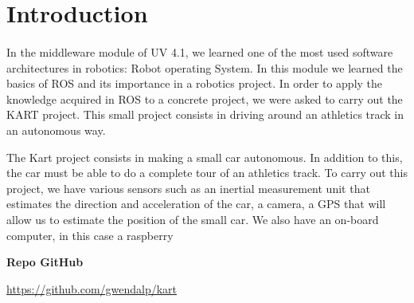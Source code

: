 \section{Introduction}
\paragraph{}In the middleware module of UV 4.1, we learned one of the most used software architectures in robotics: Robot operating System. In this module we learned the basics of ROS and its importance in a robotics project. In order to apply the knowledge acquired in ROS to a concrete project, we were asked to carry out the KART project. 
This small project consists in driving around an athletics track in an autonomous way.

The Kart project consists in making a small car autonomous. In addition to this, the car must be able to do a complete tour of an athletics track. 
To carry out this project, we have various sensors such as an inertial measurement unit that estimates the direction and acceleration of the car, a camera, a GPS that will allow us to estimate the position of the small car. We also have an on-board computer, in this case a raspberry 

\textbf{Repo GitHub}

\url{https://github.com/gwendalp/kart}

\newpage
